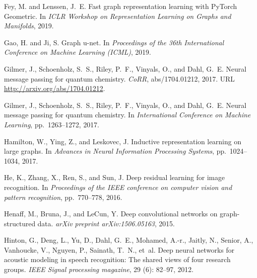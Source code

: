 \documentclass{article}
\begin{document}
\begin{thebibliography}{57}
Fey, M. and Lenssen, J.~E.
\newblock Fast graph representation learning with {PyTorch Geometric}.
\newblock In \emph{ICLR Workshop on Representation Learning on Graphs and
  Manifolds}, 2019.

Gao, H. and Ji, S.
\newblock Graph u-net.
\newblock In \emph{Proceedings of the 36th International Conference on Machine
  Learning (ICML)}, 2019.

Gilmer, J., Schoenholz, S.~S., Riley, P.~F., Vinyals, O., and Dahl, G.~E.
\newblock Neural message passing for quantum chemistry.
\newblock \emph{CoRR}, abs/1704.01212, 2017{}.
\newblock URL \url{http://arxiv.org/abs/1704.01212}.

Gilmer, J., Schoenholz, S.~S., Riley, P.~F., Vinyals, O., and Dahl, G.~E.
\newblock Neural message passing for quantum chemistry.
\newblock In \emph{International Conference on Machine Learning}, pp.\
  1263--1272, 2017{}.

Hamilton, W., Ying, Z., and Leskovec, J.
\newblock Inductive representation learning on large graphs.
\newblock In \emph{Advances in Neural Information Processing Systems}, pp.\
  1024--1034, 2017.

He, K., Zhang, X., Ren, S., and Sun, J.
\newblock Deep residual learning for image recognition.
\newblock In \emph{Proceedings of the IEEE conference on computer vision and
  pattern recognition}, pp.\  770--778, 2016.

Henaff, M., Bruna, J., and LeCun, Y.
\newblock Deep convolutional networks on graph-structured data.
\newblock \emph{arXiv preprint arXiv:1506.05163}, 2015.

Hinton, G., Deng, L., Yu, D., Dahl, G.~E., Mohamed, A.-r., Jaitly, N., Senior,
  A., Vanhoucke, V., Nguyen, P., Sainath, T.~N., et~al.
\newblock Deep neural networks for acoustic modeling in speech recognition: The
  shared views of four research groups.
\newblock \emph{IEEE Signal processing magazine}, 29\penalty0 (6):\penalty0
  82--97, 2012.


\end{thebibliography}
\end{document}
